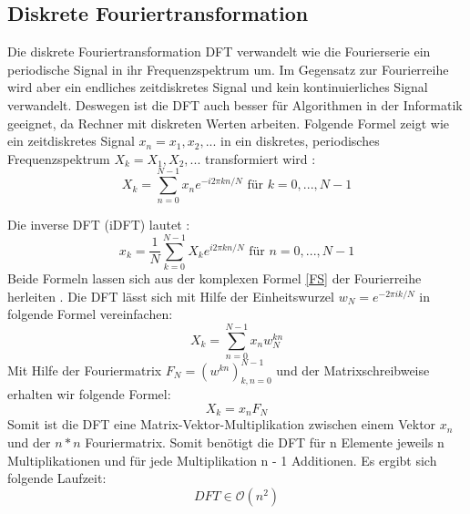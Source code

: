 \subsection{Diskrete Fouriertransformation}
Die diskrete Fouriertransformation DFT verwandelt wie die Fourierserie ein periodische Signal in ihr Frequenzspektrum um. Im Gegensatz zur Fourierreihe wird aber ein endliches zeitdiskretes Signal und kein kontinuierliches Signal verwandelt.
Deswegen ist die DFT auch besser für Algorithmen in der Informatik geeignet, da Rechner mit diskreten Werten arbeiten. Folgende Formel zeigt wie ein zeitdiskretes Signal $x_{n} = x_{1}, x_{2},...$ in ein diskretes, periodisches Frequenzspektrum $X_{k} = X_{1}, X_{2},...$ transformiert wird \cite[S.17]{and 12}:
\begin{equation}
X_{k}= \sum_{n=0}^{N-1} x_{n} e^{-i2 \pi kn /N} \text{  für } k=0,...,N-1
\label{eq:DFT}
\end{equation}

Die inverse DFT (iDFT) lautet \cite[S.20]{and 12}:
\begin{equation}
x_{k}= \frac{1}{N}\sum_{k=0}^{N-1} X_{k} e^{i2 \pi kn /N} \text{  für }  n=0,...,N-1
\label{idft}
\end{equation}
Beide Formeln lassen sich aus der komplexen Formel \ref{FS} der Fourierreihe herleiten \cite[S. 77-79]{ser 17}. Die DFT lässt sich mit Hilfe der Einheitswurzel $w_{N} = e^{-2 \pi ik /N}$ in folgende Formel vereinfachen:
\begin{equation}
X_{k}= \sum_{n=0}^{N-1} x_{n} w_{N}^{kn}
\end{equation}
Mit Hilfe der Fouriermatrix $F_{N} = (w^{kn})_{k,n=0}^{N-1}$ und der Matrixschreibweise erhalten wir folgende Formel:
\begin{equation}
X_{k} = x_{n}F_{N}
\label{eq:dft fouriermatrix}
\end{equation}
Somit ist die DFT eine Matrix-Vektor-Multiplikation zwischen einem Vektor $x_n$ und der $n*n$ Fouriermatrix.
Somit benötigt die DFT für n Elemente jeweils n Multiplikationen und für jede Multiplikation n - 1 Additionen. Es ergibt sich folgende Laufzeit: 
\begin{equation}
DFT \in \mathcal O(n^2)
\end{equation}

